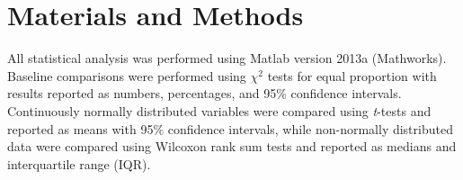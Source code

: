 \documentclass[preprint,12pt]{elsarticle}
\begin{document}

\section{Materials and Methods}



All statistical analysis was performed using Matlab version 2013a (Mathworks). Baseline comparisons were performed using $\chi^2$ tests for equal proportion with results reported as numbers, percentages, and 95\% confidence intervals. Continuously normally distributed variables were compared using \emph{t}-tests and reported as means with 95\% confidence intervals, while non-normally distributed data were compared using Wilcoxon rank sum tests and reported as medians and interquartile range (IQR).
\end{document}
